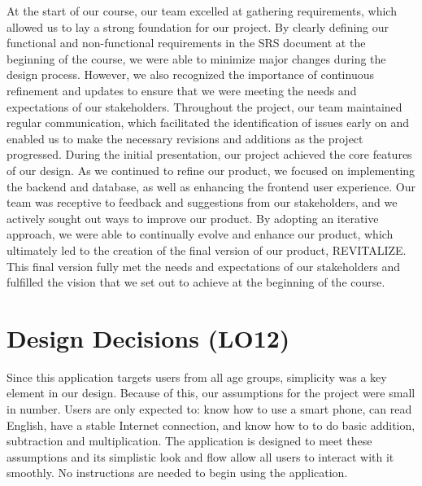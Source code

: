 \documentclass{article}
\begin{document}
At the start of our course, our team excelled at gathering requirements, which allowed us to lay a strong foundation for our project. By clearly defining our functional and non-functional requirements in the SRS document at the beginning of the course, we were able to minimize major changes during the design process. However, we also recognized the importance of continuous refinement and updates to ensure that we were meeting the needs and expectations of our stakeholders. Throughout the project, our team maintained regular communication, which facilitated the identification of issues early on and enabled us to make the necessary revisions and additions as the project progressed. During the initial presentation, our project achieved the core features of our design. As we continued to refine our product, we focused on implementing the backend and database, as well as enhancing the frontend user experience. Our team was receptive to feedback and suggestions from our stakeholders, and we actively sought out ways to improve our product. By adopting an iterative approach, we were able to continually evolve and enhance our product, which ultimately led to the creation of the final version of our product, REVITALIZE. This final version fully met the needs and expectations of our stakeholders and fulfilled the vision that we set out to achieve at the beginning of the course.

\section{Design Decisions (LO12)}
Since this application targets users from all age groups, simplicity was a key element in our design. Because of this, our assumptions for the project were small in number. Users are only expected to: know how to use a smart phone, can read English, have a stable Internet connection, and know how to to do basic addition, subtraction and multiplication. The application is designed to meet these assumptions and its simplistic look and flow allow all users to interact with it smoothly. No instructions are needed to begin using the application. 
\end{document}
